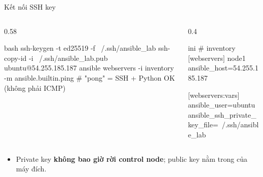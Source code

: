\documentclass[aspectratio=169,11pt,xcolor=table]{beamer}
\begin{document}
\begin{frame}[fragile]{Kết nối SSH key}
  \centering
  \par\vspace{0.15cm}
  \begin{columns}[t]
    \begin{column}{0.58\textwidth}
\begin{codeblock}[minted options={fontsize=\tiny}]{bash}
ssh-keygen -t ed25519 -f ~/.ssh/ansible_lab
ssh-copy-id -i ~/.ssh/ansible_lab.pub ubuntu@54.255.185.187
ansible webservers -i inventory -m ansible.builtin.ping
# "pong" = SSH + Python OK (không phải ICMP)
\end{codeblock}
    \end{column}
    \begin{column}{0.4\textwidth}
\begin{codeblock}[minted options={fontsize=\tiny}]{ini}
# inventory
[webservers]
node1 ansible_host=54.255.185.187

[webservers:vars]
ansible_user=ubuntu
ansible_ssh_private_key_file=~/.ssh/ansible_lab
\end{codeblock}
    \end{column}
  \end{columns}
  \raggedright
  \begin{itemize}\small
    \item Private key \textbf{không bao giờ rời control node}; public key nằm trong
           của máy đích.
  \end{itemize}
\end{frame}
\end{document}
